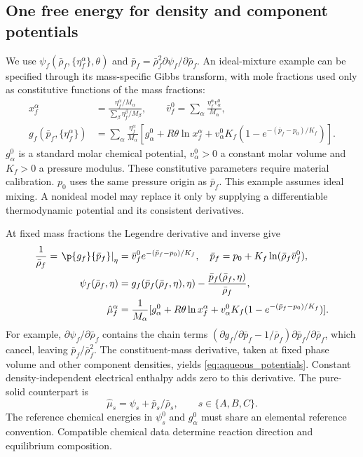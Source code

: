 \documentclass[11pt]{article}
\begin{document}
\subsection{One free energy for density and component potentials}
We use \(\psi_f(\bar\rho_f,\{\eta_f^\alpha\},\theta)\) and
\(\bar p_f=\bar\rho_f^2\partial\psi_f/\partial\bar\rho_f\).
An ideal-mixture example can be specified through its mass-specific Gibbs transform, with mole fractions used only as constitutive functions of the mass fractions:
\begin{align}
 x_f^\alpha&=\frac{\eta_f^\alpha/M_\alpha}{\sum_\beta\eta_f^\beta/M_\beta},
 \qquad \bar v_f^0=\sum_\alpha\frac{\eta_f^\alpha v_\alpha^0}{M_\alpha},\label{eq:aqueous_mole_fractions}\\
 g_f(\bar p_f,\{\eta_f^\alpha\})&=
 \sum_\alpha\frac{\eta_f^\alpha}{M_\alpha}
 \left[g_\alpha^0+R\theta\ln x_f^\alpha
 +v_\alpha^0K_f(1-e^{-(\bar p_f-p_0)/K_f})\right].\label{eq:aqueous_gibbs}
\end{align}
\(g_\alpha^0\) is a standard molar chemical potential, \(v_\alpha^0>0\) a constant molar volume and \(K_f>0\) a pressure modulus. These constitutive parameters require material calibration. \(p_0\) uses the same pressure origin as \(\bar p_f\). This example assumes ideal mixing. A nonideal model may replace it only by supplying a differentiable thermodynamic potential and its consistent derivatives.

At fixed mass fractions the Legendre derivative and inverse give
\begin{align}
 \frac1{\bar\rho_f}=\left.\p{g_f}{\bar p_f}\right|_{\eta}
 &=\bar v_f^0e^{-(\bar p_f-p_0)/K_f},
 \quad \bar p_f=p_0+K_f\ln(\bar\rho_f\bar v_f^0),\label{eq:aqueous_eos}\\
 \psi_f(\bar\rho_f,\eta)&=g_f(\bar p_f(\bar\rho_f,\eta),\eta)-\frac{\bar p_f(\bar\rho_f,\eta)}{\bar\rho_f},\label{eq:aqueous_helmholtz}\\
 \hat\mu_f^\alpha&=\frac1{M_\alpha}
 [g_\alpha^0+R\theta\ln x_f^\alpha+v_\alpha^0K_f(1-e^{-(\bar p_f-p_0)/K_f})].\label{eq:aqueous_potentials}
\end{align}
For example, \(\partial\psi_f/\partial\bar\rho_f\) contains the chain terms
\((\partial g_f/\partial\bar p_f-1/\bar\rho_f)\partial\bar p_f/\partial\bar\rho_f\), which cancel, leaving \(\bar p_f/\bar\rho_f^2\). The constituent-mass derivative, taken at fixed phase volume and other component densities, yields \eqref{eq:aqueous_potentials}. Constant density-independent electrical enthalpy adds zero to this derivative. The pure-solid counterpart is
\begin{equation}
 \hat\mu_s=\psi_s+\bar p_s/\bar\rho_s,
 \qquad s\in\{A,B,C\}.
 \label{eq:solid_potential}
\end{equation}
The reference chemical energies in \(\psi_s^0\) and \(g_\alpha^0\) must share an elemental reference convention. Compatible chemical data determine reaction direction and equilibrium composition.
\end{document}
